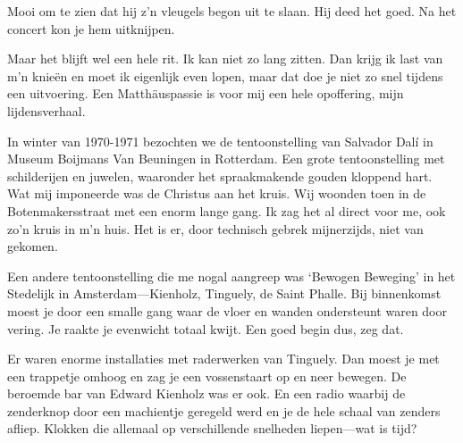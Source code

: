 \documentclass[10pt,twoside, openright]{memoir}
\begin{document}
Mooi om te zien dat hij z’n vleugels begon uit te slaan. Hij deed het goed. Na het concert kon je hem uitknijpen.  

Maar het blijft wel een hele rit. Ik kan niet zo lang zitten. Dan krijg ik last van m’n knieën en moet ik eigenlijk even lopen, maar dat doe je niet zo snel tijdens een uitvoering. Een Matthäuspassie is voor mij een hele opoffering, mijn lijdensverhaal.

In winter van 1970-1971 bezochten we de tentoonstelling van Salvador Dalí in Museum Boijmans Van Beuningen in Rotterdam. Een grote tentoonstelling met schilderijen en juwelen, waaronder het spraakmakende gouden kloppend hart. Wat mij imponeerde was de Christus aan het kruis. Wij woonden toen in de Botenmakersstraat met een enorm lange gang. Ik zag het al direct voor me, ook zo’n kruis in m’n huis. Het is er, door technisch gebrek mijnerzijds, niet van gekomen.

Een andere tentoonstelling die me nogal aangreep was `Bewogen Beweging' in het Stedelijk in Amsterdam---Kienholz, Tinguely, de Saint Phalle. Bij binnenkomst moest je door een smalle gang waar de vloer en wanden ondersteunt waren door vering. Je raakte je evenwicht totaal kwijt. Een goed begin dus, zeg dat.

Er waren enorme installaties met raderwerken van Tinguely. Dan moest je met een trappetje omhoog en zag je een vossenstaart op en neer bewegen. De beroemde bar van Edward Kienholz was er ook. En een radio waarbij de zenderknop door een machientje geregeld werd en je de hele schaal van zenders afliep. Klokken die allemaal op verschillende snelheden liepen---wat is tijd? 
\end{document}
